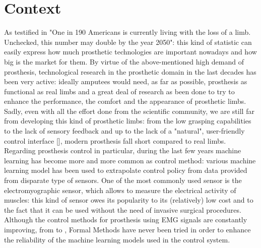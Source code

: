 \section{Context}\label{s:context}
As testified in \cite{ZIEGLERGRAHAM2008422} "One in 190 Americans is currently living with the loss of a limb. Unchecked, this number may double by the year 2050": this kind of statistic can easily express how much prosthetic technologies are important nowadays and how big is the market for them.
By virtue of the above-mentioned high demand of prosthesis, technological research in the prosthetic domain in the last decades has been very active: ideally amputees would need, as far as possible, prosthesis as functional as real limbs and a great deal of research as been done to try to enhance the performance, the comfort and the appearance of prosthetic limbs. Sadly, even with all the effort done from the scientific community, we are still far from developing this kind of prosthetic limbs: from the low grasping capabilities to the lack of sensory feedback and up to the lack of a "natural", user-friendly control interface [\cite{Zecca2002}], modern prosthesis fall short compared to real limbs.
Regarding prosthesis control in particular, during the last few years machine learning has become more and more common as control method: various machine learning model has been used to extrapolate control policy from data provided from disparate type of sensors. One of the most commonly used sensor is the electromyographic sensor, which allows to measure the electrical activity of muscles: this kind of sensor owes its popularity to its (relatively) low cost and to the fact that it can be used without the need of invasive surgical procedures. Although the control methods for prosthesis using EMG signals are constantly improving, from \cite{Zecca2002} to \cite{Strazzulla2017}, Formal Methods have never been tried in order to enhance the reliability of the machine learning models used in the control system. 